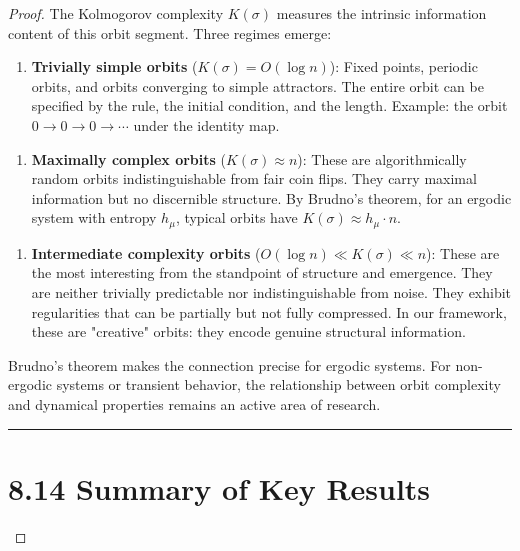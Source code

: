 \begin{proof}
The Kolmogorov complexity $K(\sigma)$ measures the intrinsic information content of this orbit segment. Three regimes emerge:

\begin{enumerate}
  \item \textbf{Trivially simple orbits} ($K(\sigma) = O(\log n)$): Fixed points, periodic orbits, and orbits converging to simple attractors. The entire orbit can be specified by the rule, the initial condition, and the length. Example: the orbit $0 \to 0 \to 0 \to \cdots$ under the identity map.
\end{enumerate}

\begin{enumerate}
  \item \textbf{Maximally complex orbits} ($K(\sigma) \approx n$): These are algorithmically random orbits indistinguishable from fair coin flips. They carry maximal information but no discernible structure. By Brudno's theorem, for an ergodic system with entropy $h_\mu$, typical orbits have $K(\sigma) \approx h_\mu \cdot n$.
\end{enumerate}

\begin{enumerate}
  \item \textbf{Intermediate complexity orbits} ($O(\log n) \ll K(\sigma) \ll n$): These are the most interesting from the standpoint of structure and emergence. They are neither trivially predictable nor indistinguishable from noise. They exhibit regularities that can be partially but not fully compressed. In our framework, these are "creative" orbits: they encode genuine structural information.
\end{enumerate}

Brudno's theorem makes the connection precise for ergodic systems. For non-ergodic systems or transient behavior, the relationship between orbit complexity and dynamical properties remains an active area of research.

\bigskip\hrule\bigskip

\section{8.14 Summary of Key Results}


\end{proof}

